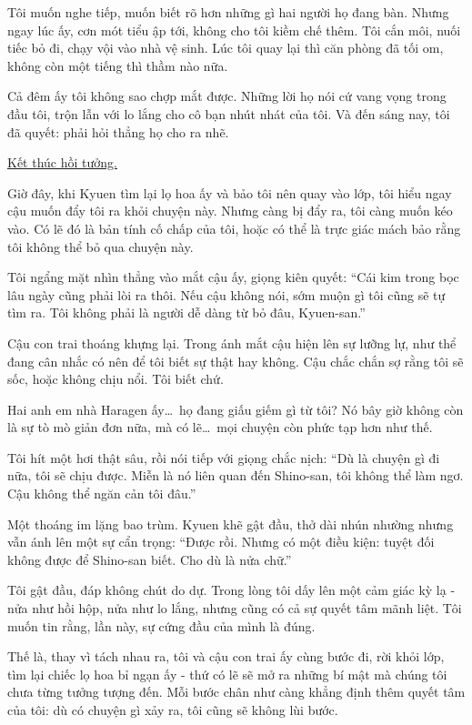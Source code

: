 \documentclass[../main.tex]{subfiles}
\begin{document}
Tôi muốn nghe tiếp, muốn biết rõ hơn những gì hai người họ đang bàn. Nhưng ngay lúc ấy, cơn mót tiểu ập tới, không cho tôi kiềm chế thêm. Tôi cắn môi, nuối tiếc bỏ đi, chạy vội vào nhà vệ sinh. Lúc tôi quay lại thì căn phòng đã tối om, không còn một tiếng thì thầm nào nữa.

Cả đêm ấy tôi không sao chợp mắt được. Những lời họ nói cứ vang vọng trong đầu tôi, trộn lẫn với lo lắng cho cô bạn nhút nhát của tôi. Và đến sáng nay, tôi đã quyết: phải hỏi thẳng họ cho ra nhẽ.

\begin{center}
  \uline{Kết thúc hồi tưởng.}
\end{center}

Giờ đây, khi Kyuen tìm lại lọ hoa ấy và bảo tôi nên quay vào lớp, tôi hiểu ngay cậu muốn đẩy tôi ra khỏi chuyện này. Nhưng càng bị đẩy ra, tôi càng muốn kéo vào. Có lẽ đó là bản tính cố chấp của tôi, hoặc có thể là trực giác mách bảo rằng tôi không thể bỏ qua chuyện này.

Tôi ngẩng mặt nhìn thẳng vào mắt cậu ấy, giọng kiên quyết: ``Cái kim trong bọc lâu ngày cũng phải lòi ra thôi. Nếu cậu không nói, sớm muộn gì tôi cũng sẽ tự tìm ra. Tôi không phải là người dễ dàng từ bỏ đâu, Kyuen-san.''

Cậu con trai thoáng khựng lại. Trong ánh mắt cậu hiện lên sự lưỡng lự, như thể đang cân nhắc có nên để tôi biết sự thật hay không. Cậu chắc chắn sợ rằng tôi sẽ sốc, hoặc không chịu nổi. Tôi biết chứ.

Hai anh em nhà Haragen ấy\dots\ họ đang giấu giếm gì từ tôi? Nó bây giờ không còn là sự tò mò giản đơn nữa, mà có lẽ\dots\ mọi chuyện còn phức tạp hơn như thế.

Tôi hít một hơi thật sâu, rồi nói tiếp với giọng chắc nịch: ``Dù là chuyện gì đi nữa, tôi sẽ chịu được. Miễn là nó liên quan đến Shino-san, tôi không thể làm ngơ. Cậu không thể ngăn cản tôi đâu.''

Một thoáng im lặng bao trùm. Kyuen khẽ gật đầu, thở dài nhún nhường nhưng vẫn ánh lên một sự cẩn trọng: ``Được rồi. Nhưng có một điều kiện: tuyệt đối không được để Shino-san biết. Cho dù là nửa chữ.''

Tôi gật đầu, đáp không chút do dự. Trong lòng tôi dấy lên một cảm giác kỳ lạ - nửa như hồi hộp, nửa như lo lắng, nhưng cũng có cả sự quyết tâm mãnh liệt. Tôi muốn tin rằng, lần này, sự cứng đầu của mình là đúng.

Thế là, thay vì tách nhau ra, tôi và cậu con trai ấy cùng bước đi, rời khỏi lớp, tìm lại chiếc lọ hoa bỉ ngạn ấy - thứ có lẽ sẽ mở ra những bí mật mà chúng tôi chưa từng tưởng tượng đến. Mỗi bước chân như càng khẳng định thêm quyết tâm của tôi: dù có chuyện gì xảy ra, tôi cũng sẽ không lùi bước.
\end{document}
